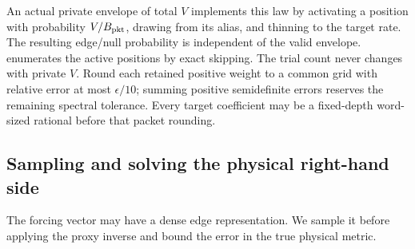 \documentclass[11pt]{article}
\theoremstyle{remark}
\begin{document}
An actual private envelope of total $V$ implements this law by activating a
position with probability $V/B_{\rm pkt}$, drawing from its alias, and thinning
to the target rate.
The resulting edge/null probability is independent of the valid envelope.
 enumerates the active positions by exact skipping.
The trial count never changes with private $V$.
Round each retained positive weight to a common grid with relative error at most
$\epsilon/10$; summing positive semidefinite errors reserves the remaining
spectral tolerance.
Every target coefficient may be a fixed-depth word-sized rational before that
packet rounding.

\subsection{Sampling and solving the physical right-hand side}

The forcing vector may have a dense edge representation.
We sample it before applying the proxy inverse and bound the error in the true
physical metric.
\end{document}
